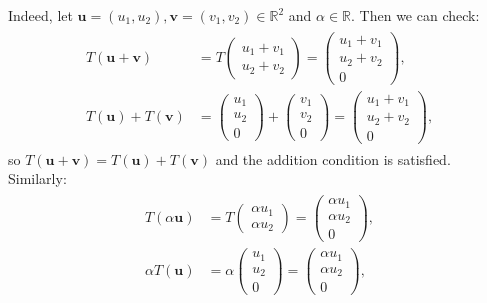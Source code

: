 \documentclass[letterpaper,10pt,english]{jupyterBook}
\begin{document}
\sphinxAtStartPar
Indeed, let \(\mathbf{u} = (u_1, u_2), \mathbf{v} = (v_1, v_2) \in \mathbb{R}^2\) and \(\alpha \in \mathbb{R}\). Then we can check:
\begin{equation*}
\begin{split} \begin{align*}
    T (\mathbf{u} + \mathbf{v})
    &= T \begin{pmatrix} u_1 + v_1 \\ u_2 + v_2 \end{pmatrix}
    = \begin{pmatrix} u_1 + v_1 \\ u_2 + v_2 \\ 0 \end{pmatrix}, \\
    T (\mathbf{u}) + T(\mathbf{v}) &=
    \begin{pmatrix} u_1 \\ u_2 \\ 0 \end{pmatrix} + \begin{pmatrix} v_1 \\ v_2 \\ 0 \end{pmatrix}
    = \begin{pmatrix} u_1 + v_1 \\ u_2 + v_2 \\ 0 \end{pmatrix},
\end{align*} \end{split}
\end{equation*}
\sphinxAtStartPar
so \(T(\mathbf{u} + \mathbf{v}) = T(\mathbf{u}) + T(\mathbf{v})\) and the addition condition is satisfied. Similarly:
\begin{equation*}
\begin{split} \begin{align*}
    T(\alpha \mathbf{u})
    &= T \begin{pmatrix} \alpha u_1 \\ \alpha u_2 \end{pmatrix}
    = \begin{pmatrix} \alpha u_1 \\ \alpha u_2 \\ 0 \end{pmatrix}, \\
    \alpha T(\mathbf{u}) &= \alpha \begin{pmatrix} u_1 \\ u_2 \\ 0 \end{pmatrix}
    = \begin{pmatrix} \alpha u_1 \\ \alpha u_2 \\ 0 \end{pmatrix},
\end{align*} \end{split}
\end{equation*}
\end{document}
